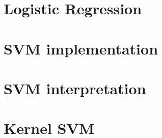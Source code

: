 \documentclass[12pt]{article}
\begin{document}
\maketitle


\section{Logistic Regression}

\section{SVM implementation}

\section{SVM interpretation}

\section{Kernel SVM}
\end{document}
